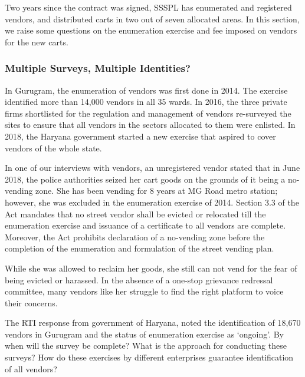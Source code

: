 \documentclass[a4paper, 12pt, twoside]{article}
\begin{document}
{{Two years since the contract was signed, SSSPL has enumerated and registered vendors, and distributed carts in two out of seven allocated areas. In this section, we raise some questions on the enumeration exercise and fee imposed on vendors for the new carts.

\subsubsection*{Multiple Surveys, Multiple Identities?}

In Gurugram, the enumeration of vendors was first done in 2014. The exercise identified more than 14,000 vendors in all 35 wards. In 2016, the three private firms shortlisted for the regulation and management of vendors re-surveyed the sites to ensure that all vendors in the sectors allocated to them were enlisted. In 2018, the Haryana government started a new exercise that aspired to cover vendors of the whole state. \\

\begin{mdframed}[backgroundcolor=gray!20]
In one of our interviews with vendors, an unregistered vendor stated that in June 2018, the police authorities seized her cart goods on the grounds of it being a no-vending zone. She has been vending for 8 years at MG Road metro station; however, she was excluded in the enumeration exercise of 2014. Section 3.3 of the Act mandates that no street vendor shall be evicted or relocated till the enumeration exercise and issuance of a certificate to all vendors are complete. Moreover, the Act prohibits declaration of a no-vending zone before the completion of the enumeration and formulation of the street vending plan.

While she was allowed to reclaim her goods, she still can not vend for the fear of being evicted or harassed. In the absence of a one-stop grievance redressal committee, many vendors like her struggle to find the right platform to voice their concerns.
\end{mdframed}

The RTI response from government of Haryana, noted the identification of 18,670 vendors in Gurugram and the status of enumeration exercise as ‘ongoing’. By when will the survey be complete? What is the approach for conducting these surveys? How do these exercises by different enterprises guarantee identification of all vendors?

}}
\end{document}
